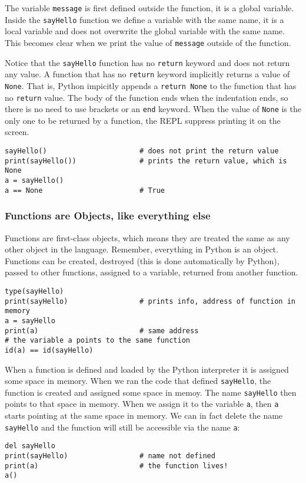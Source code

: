 \documentclass[12pt, a4paper]{article}
\begin{document}
The variable \texttt{message} is first defined outside the function, it is a global variable.
Inside the \texttt{sayHello} function we define a variable with the same name, it is a local variable and does not overwrite the global variable with the same name.
This becomes clear when we print the value of \texttt{message} outside of the function.

Notice that the \texttt{sayHello} function has no \texttt{return} keyword and does not return any value.
A function that has no \texttt{return} keyword implicitly returns a value of \texttt{None}.
That is, Python impicitly appends a \texttt{return None} to the function that has no \texttt{return} value.
The body of the function ends when the indentation ends, so there is no need to use brackets or an \texttt{end} keyword.
When the value of \texttt{None} is the only one to be returned by a function, the REPL suppress printing it on the screen.
\lstset{language=jupyter-python,label= ,caption= ,captionpos=b,numbers=none}
\begin{lstlisting}
sayHello()                      # does not print the return value
print(sayHello())               # prints the return value, which is None
a = sayHello()
a == None                       # True
\end{lstlisting}
\subsubsection{Functions are Objects, like everything else}
\label{sec:orgbba6de7}
Functions are first-class objects, which means they are treated the same as any other object in the language.
Remember, everything in Python is an object.
Functions can be created, destroyed (this is done automatically by Python), passed to other functions, assigned to a variable, returned from another function.
\lstset{language=jupyter-python,label= ,caption= ,captionpos=b,numbers=none}
\begin{lstlisting}
type(sayHello)
print(sayHello)                 # prints info, address of function in memory
a = sayHello
print(a)                        # same address
# the variable a points to the same function
id(a) == id(sayHello)
\end{lstlisting}
When a function is defined and loaded by the Python interpreter it is assigned some space in memory.
When we ran the code that defined \texttt{sayHello}, the function is created and assigned some space in memoy.
The name \texttt{sayHello} then points to that space in memory.
When we assign it to the variable \texttt{a}, then \texttt{a} starts pointing at the same space in memory.
We can in fact delete the name \texttt{sayHello} and the function will still be accessible via the name \texttt{a}:
\lstset{language=jupyter-python,label= ,caption= ,captionpos=b,numbers=none}
\begin{lstlisting}
del sayHello
print(sayHello)                 # name not defined
print(a)                        # the function lives!
a()
\end{lstlisting}
\end{document}
